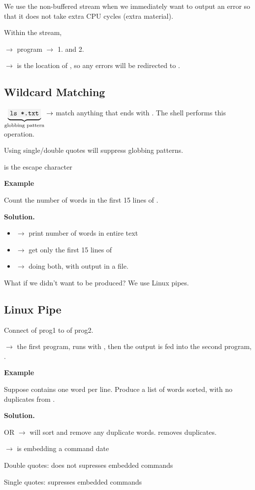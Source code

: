 We use the non-buffered stream when we immediately want to output an error
so that it does not take extra CPU cycles (extra material).

Within the stream,

 $ \rightarrow $ program $ \rightarrow $ 
1.  and 2. 

 $ \rightarrow $
 is the location of , so any errors will be redirected to
.

\subsection{Wildcard Matching}
$ \underbrace{\code{ls *.txt}}_{\text{globbing pattern}} \rightarrow $
match anything that ends with . The shell performs this operation.

Using single/double quotes will suppress globbing patterns.

\code{\textbackslash} is the escape character

\textbf{Example}

Count the number of words in the first 15 lines of .

\textbf{Solution.}

\begin{itemize}
    \item {} $ \rightarrow $ print number of words in entire text
    \item {} $ \rightarrow $ get only the first 15 lines
    of 
    \item {} $ \rightarrow $
    doing both, with output in a  file.
\end{itemize}

What if we didn't want  to be produced? We use Linux pipes.

\subsection{Linux Pipe}
Connect  of prog1 to  of prog2.

 $ \rightarrow $
the first program,  runs with , then the output is fed into
the second program, .

\textbf{Example}

Suppose  contains one word per line. Produce
a list of words sorted, with no duplicates from .

\textbf{Solution.}

 OR 
 $ \rightarrow $  will sort
and remove any duplicate words.  removes duplicates.

 $ \rightarrow $
 is embedding a command date

Double quotes: does not supresses embedded commands

Single quotes: supresses embedded commands
